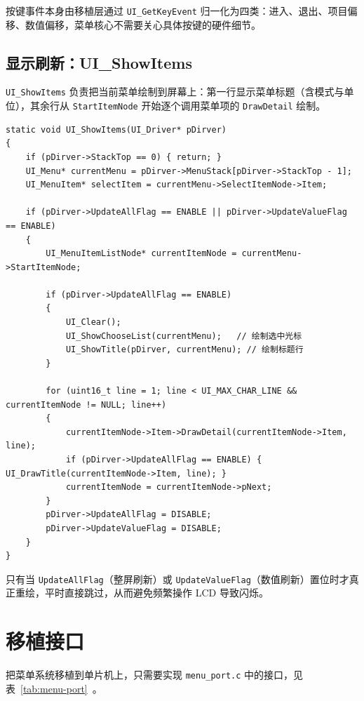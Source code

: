 按键事件本身由移植层通过 \texttt{UI\_GetKeyEvent} 归一化为四类：进入、退出、项目偏移、数值偏移，菜单核心不需要关心具体按键的硬件细节。

\subsection{显示刷新：UI\_ShowItems}

\texttt{UI\_ShowItems} 负责把当前菜单绘制到屏幕上：第一行显示菜单标题（含模式与单位），其余行从 \texttt{StartItemNode} 开始逐个调用菜单项的 \texttt{DrawDetail} 绘制。

\begin{lstlisting}[style=c]
static void UI_ShowItems(UI_Driver* pDirver)
{
    if (pDirver->StackTop == 0) { return; }
    UI_Menu* currentMenu = pDirver->MenuStack[pDirver->StackTop - 1];
    UI_MenuItem* selectItem = currentMenu->SelectItemNode->Item;

    if (pDirver->UpdateAllFlag == ENABLE || pDirver->UpdateValueFlag == ENABLE)
    {
        UI_MenuItemListNode* currentItemNode = currentMenu->StartItemNode;

        if (pDirver->UpdateAllFlag == ENABLE)
        {
            UI_Clear();
            UI_ShowChooseList(currentMenu);   // 绘制选中光标
            UI_ShowTitle(pDirver, currentMenu); // 绘制标题行
        }

        for (uint16_t line = 1; line < UI_MAX_CHAR_LINE && currentItemNode != NULL; line++)
        {
            currentItemNode->Item->DrawDetail(currentItemNode->Item, line);
            if (pDirver->UpdateAllFlag == ENABLE) { UI_DrawTitle(currentItemNode->Item, line); }
            currentItemNode = currentItemNode->pNext;
        }
        pDirver->UpdateAllFlag = DISABLE;
        pDirver->UpdateValueFlag = DISABLE;
    }
}
\end{lstlisting}

只有当 \texttt{UpdateAllFlag}（整屏刷新）或 \texttt{UpdateValueFlag}（数值刷新）置位时才真正重绘，平时直接跳过，从而避免频繁操作 LCD 导致闪烁。

\section{移植接口}

把菜单系统移植到单片机上，只需要实现 \texttt{menu\_port.c} 中的接口，见表~\ref{tab:menu-port}~。

